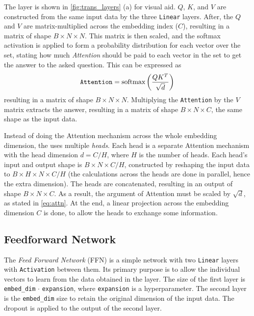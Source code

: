 The \MHSA layer is shown in \cref{fig:trans_layers} (a) for visual aid. 
$Q$, $K$, and $V$ are constructed from the same input data by the three \texttt{Linear} layers.
After, the $Q$ and $V$ are matrix-multiplied across the embedding index ($C$), resulting in a matrix of shape $B \times N \times N$.
This matrix is then scaled, and the softmax activation is applied to form a probability distribution for each vector over the set, stating how much \emph{Attention} should be paid to each vector in the set to get the answer to the asked question.
This can be expressed as 
\begin{equation}
    \label{eq:attn}
    \text{\texttt{Attention}} = \text{softmax}\left(\frac{QK^T}{\sqrt{d}}\right)
\end{equation}
resulting in a matrix of shape $B \times N \times N$.
Multiplying the \texttt{Attention} by the $V$ matrix extracts the answer, resulting in a  matrix of shape $B \times N \times C$, the same shape as the input data.

Instead of doing the Attention mechanism across the whole embedding dimension, the \trans uses multiple \emph{heads}.
Each head is a separate Attention mechanism with the head dimension $d = C / H$, where $H$ is the number of heads. 
Each head's input and output shape is $B \times N \times C/H$, constructed by reshaping the input data to $B \times H \times N \times C/H$ (the calculations across the heads are done in parallel, hence the extra dimension).
The heads are concatenated, resulting in an output of shape $B \times N \times C$.
As a result, the argument of Attention must be scaled by $\sqrt{d}$, as stated in \cref{eq:attn}.
At the end, a linear projection across the embedding dimension $C$ is done, to allow the heads to exchange some information. 

\subsection{Feedforward Network}
\label{sec:ffn}
The \emph{Feed Forward Network} (FFN) is a simple network with two \texttt{Linear} layers with \texttt{Activation} between them.
Its primary purpose is to allow the individual vectors to learn from the data obtained in the \MHSA layer. 
The size of the first layer is \texttt{embed\_dim} $\cdot$ \texttt{expansion}, where \texttt{expansion} is a hyperparameter.
The second layer is the \texttt{embed\_dim} size to retain the original dimension of the input data.
The dropout is applied to the output of the second layer.


